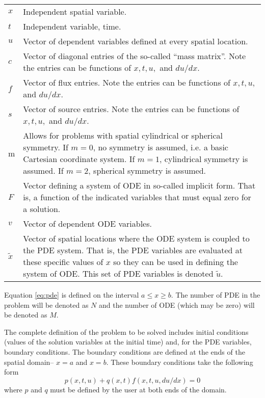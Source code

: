 \documentclass{article}
\begin{document}
\begin{tabular}{lp{4in}}
 $x$ &  Independent spatial variable. \\
$t$  &  Independent variable, time. \\
 $u$ & Vector of dependent variables defined at every spatial location. \\
$c$ & Vector of diagonal entries of the so-called ``mass matrix''. Note
the entries can be functions of $x, t, u,$ and $du/dx$.  \\
$f$ & Vector of flux entries. Note
the entries can be functions of $x, t, u,$ and $du/dx$.  \\
$s$ & Vector of source entries. Note
the entries can be functions of $x, t, u,$ and $du/dx$.  \\
m & Allows for problems with spatial cylindrical or spherical symmetry. If $m=0$,
no symmetry is assumed, i.e. a basic Cartesian coordinate system. If $m=1$,
cylindrical symmetry is assumed. If $m=2$, spherical symmetry is assumed. \\
$F$ & Vector defining a system of ODE in so-called implicit form. That is, a function of
the indicated variables that must equal zero for a solution. \\
$v$ & Vector of dependent ODE variables. \\
$\tilde x$ & Vector of spatial locations where the ODE system is coupled to the PDE system.
That is, the PDE variables are evaluated at these specific values of $x$ so they can be used
in defining the system of ODE. This set of PDE variables is denoted $\tilde u$.
\end{tabular}

\medskip
Equation \eqref{eq:pde} is defined on the interval $a\le x \ge b$.
The number of PDE in the problem will be denoted as $N$ and the number of ODE (which may be zero) will be
denoted as $M$.

The complete definition of the problem to be solved includes initial conditions (values of the solution variables at the initial time) and,
for the PDE variables, boundary conditions. The boundary conditions are defined at the ends of the spatial domain-- $x=a$ and $x=b$.
These boundary conditions take the following form
\begin{equation}\label{eq:bc}
p(x,t,u) + q(x,t)f(x,t,u,du/dx) = 0
\end{equation}
where $p$ and $q$ must be defined by the user at both ends of the domain.
\end{document}
